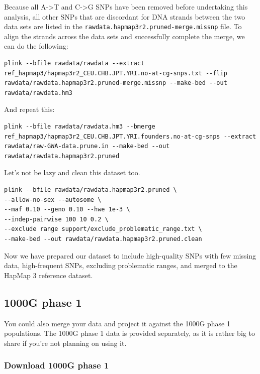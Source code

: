 \documentclass[
]{book}
\begin{document}
Because all A-\textgreater T and C-\textgreater G SNPs have been removed before undertaking this analysis, all other SNPs that are discordant for DNA strands between the two data sets are listed in the \texttt{rawdata.hapmap3r2.pruned-merge.missnp} file. To align the strands across the data sets and successfully complete the merge, we can do the following:

\begin{verbatim}
plink --bfile rawdata/rawdata --extract ref_hapmap3/hapmap3r2_CEU.CHB.JPT.YRI.no-at-cg-snps.txt --flip rawdata/rawdata.hapmap3r2.pruned-merge.missnp --make-bed --out rawdata/rawdata.hm3
\end{verbatim}

And repeat this:

\begin{verbatim}
plink --bfile rawdata/rawdata.hm3 --bmerge ref_hapmap3/hapmap3r2_CEU.CHB.JPT.YRI.founders.no-at-cg-snps --extract rawdata/raw-GWA-data.prune.in --make-bed --out rawdata/rawdata.hapmap3r2.pruned
\end{verbatim}

Let's not be lazy and clean this dataset too.

\begin{verbatim}
plink --bfile rawdata/rawdata.hapmap3r2.pruned \
--allow-no-sex --autosome \
--maf 0.10 --geno 0.10 --hwe 1e-3 \
--indep-pairwise 100 10 0.2 \
--exclude range support/exclude_problematic_range.txt \
--make-bed --out rawdata/rawdata.hapmap3r2.pruned.clean
\end{verbatim}

Now we have prepared our dataset to include high-quality SNPs with few missing data, high-frequent SNPs, excluding problematic ranges, and merged to the HapMap 3 reference dataset.

\hypertarget{g-phase-1}{%
\subsection{1000G phase 1}\label{g-phase-1}}

You could also merge your data and project it against the 1000G phase 1 populations. The 1000G phase 1 data is provided separately, as it is rather big to share if you're not planning on using it.

\hypertarget{download-1000g-phase-1}{%
\subsubsection{Download 1000G phase 1}\label{download-1000g-phase-1}}
\end{document}
